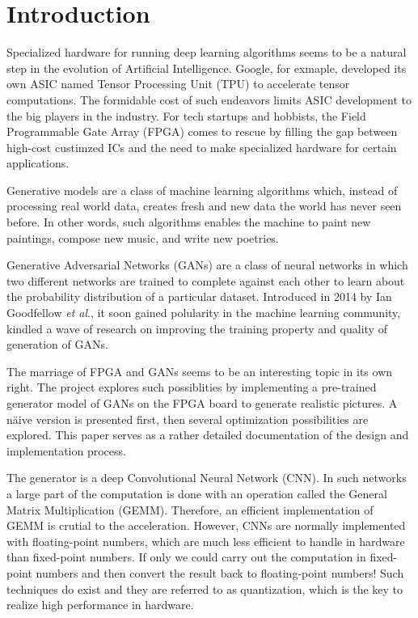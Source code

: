 
\chapter{Introduction}

Specialized hardware for running deep learning algorithms seems to be a natural step in the evolution of
Artificial Intelligence.  Google, for exmaple, developed its own ASIC named Tensor Processing Unit (TPU)
to accelerate tensor computations. The formidable cost of such endeavors limits ASIC development to the big
players in the industry. For tech startups and hobbists, the Field Programmable Gate Array (FPGA) comes to
rescue by filling the gap between high-cost custimzed ICs and the need to make specialized hardware for certain
applications.

Generative models are a class of machine learning algorithms which, instead of processing real world data,
creates fresh and new data the world has never seen before. In other words, such algorithms enables
the machine to paint new paintings, compose new music, and write new poetries.

Generative Adversarial Networks (GANs) are a class of neural networks in which two different networks are
trained to complete against each other to learn about the probability distribution of a particular dataset.
Introduced in 2014 by Ian Goodfellow \textit{et al}., it soon gained polularity in the machine learning
community, kindled a wave of research on improving the training property and quality of generation of GANs.

The marriage of FPGA and GANs seems to be an interesting topic in its own right. The project explores such
possiblities by implementing a pre-trained generator model of GANs on the FPGA board to generate realistic
pictures. A näive version is presented first, then several optimization possibilities are explored. This
paper serves as a rather detailed documentation of the design and implementation process.

The generator is a deep Convolutional Neural Network (CNN). In such networks a large part of the computation is
done with an operation called the General Matrix Multiplication (GEMM). Therefore, an efficient implementation
of GEMM is crutial to the acceleration. However, CNNs are normally implemented with floating-point numbers,
which are much less efficient to handle in hardware than fixed-point numbers. If only we could carry out
the computation in fixed-point numbers and then convert the result back to floating-point numbers! Such
techniques do exist and they are referred to as quantization, which is the key to realize high performance
in hardware.

\clearpage %
